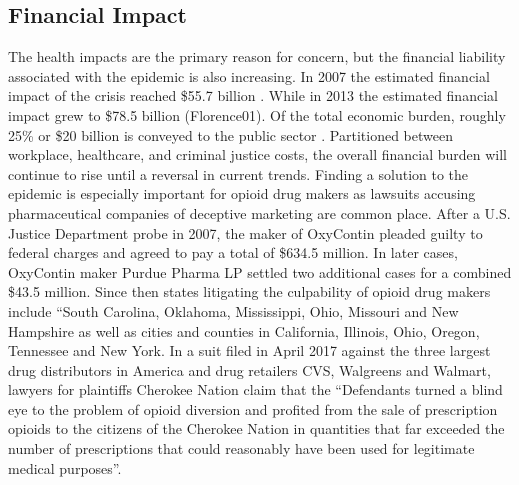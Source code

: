 \documentclass[sigconf]{acmart}
\begin{document}
\subsection{Financial Impact} 
The health impacts are the primary reason for concern, but the financial liability associated with the epidemic is also increasing. In 2007 the estimated financial impact of the crisis reached \$55.7 billion \cite{Birnbaum01}. While in 2013 the estimated financial impact grew to \$78.5 billion (Florence01). Of the total economic burden, roughly 25\% or \$20 billion is conveyed to the public sector \cite{Florence01}. Partitioned between workplace, healthcare, and criminal justice costs, the overall financial burden will continue to rise until a reversal in current trends. Finding a solution to the epidemic is especially important for opioid drug makers as lawsuits accusing pharmaceutical companies of deceptive marketing are common place. After a U.S. Justice Department probe in 2007, the maker of OxyContin pleaded guilty to federal charges and agreed to pay a total of \$634.5 million. In later cases, OxyContin maker Purdue Pharma LP settled two additional cases for a combined \$43.5 million. Since then states litigating the culpability of opioid drug makers include “South Carolina, Oklahoma, Mississippi, Ohio, Missouri and New Hampshire as well as cities and counties in California, Illinois, Ohio, Oregon, Tennessee and New York\cite{opsis11}. In a suit filed in April 2017 against the three largest drug distributors in America and drug retailers CVS, Walgreens and Walmart, lawyers for plaintiffs Cherokee Nation claim that the ``Defendants turned a blind eye to the problem of opioid diversion and profited from the sale of prescription opioids to the citizens of the Cherokee Nation in quantities that far exceeded the number of prescriptions that could reasonably have been used for legitimate medical purposes''\cite{opsis5}.
\end{document}
